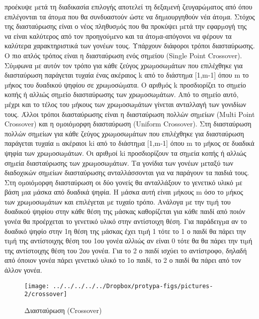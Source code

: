  προέκυψε µετά τη διαδικασία επιλογής αποτελεί τη δεξαµενή ζευγαρώµατος από όπου επιλέγονται τα άτοµα που θα συνδυαστούν ώστε να δηµιουργηθούν νέα άτοµα. Στόχος της διασταύρωσης είναι ο νέος πληθυσµός που θα προκύψει µετά την εφαρµογή της να είναι καλύτερος από τον προηγούµενο και τα άτοµα-απόγονοι να φέρουν τα καλύτερα χαρακτηριστικά των γονέων τους. Υπάρχουν διάφοροι τρόποι διασταύρωσης. Ο πιο απλός τρόπος είναι η διασταύρωση ενός σηµείου (Single Point Crossover). Σύµφωνα µε αυτόν τον τρόπο για κάθε ζεύγος χρωµοσωµάτων που επιλέχθηκε για διασταύρωση παράγεται τυχαία ένας ακέραιος k από το διάστηµα [1,m-1] όπου m το µήκος του δυαδικού ψηφίου σε χρωµοσώµατα. Ο αριθµός k προσδιορίζει το σηµείο κοπής ή αλλιώς σηµείο διασταύρωσης των χρωµοσωµάτων. Από το σηµείο αυτό, µέχρι και το τέλος του µήκους των χρωµοσωµάτων γίνεται ανταλλαγή των γονιδίων τους. Άλλοι τρόποι διασταύρωσης είναι η διασταύρωση πολλών σηµείων (Multi Point Crossover) και η οµοιόµορφη διασταύρωση (Uniform Crossover). Στη διασταύρωση πολλών σηµείων για κάθε ζεύγος χρωµοσωµάτων που επιλέχθηκε για διασταύρωση παράγεται τυχαία n ακέραιοι ki από το διάστηµα [1,m-1] όπου m το µήκος σε δυαδικά ψηφία των χρωµοσωµάτων. Οι αριθµοί ki προσδιορίζουν τα σηµεία κοπής ή αλλιώς σηµεία διασταύρωσης των χρωµοσωµάτων. Τα γονίδια των γονέων µεταξύ των διαδοχικών σηµείων διασταύρωσης ανταλλάσσονται για να παράγουν τα παιδιά τους. Στη οµοιόµορφη διασταύρωση οι δύο γονείς θα ανταλλάξουν το γενετικό υλικό
 µε βάση µια µάσκα από δυαδικά ψηφία. Η µάσκα αυτή είναι µήκους m όσο το µήκος των χρωµοσωµάτων και επιλέγεται µε τυχαίο τρόπο. Ανάλογα µε την τιµή του δυαδικού ψηφίου στην κάθε θέση της µάσκας καθορίζεται για κάθε παιδί από ποιόν γονέα θα προέρχεται το γενετικό υλικό στην αντίστοιχη θέση. Για παράδειγµα αν το δυαδικό ψηφίο στην 1η θέση της µάσκας έχει τιµή 1 τότε το 1 ο παιδί θα πάρει την τιµή της αντίστοιχης θέση του 1ου γονέα αλλιώς αν είναι 0 τότε θα θα πάρει την τιµή της αντίστοιχης θέση του 2ου γονέα. Για το 2 ο παιδί ισχύει το αντίστροφο, δηλαδή από όποιον γονέα πάρει γενετικό υλικό το 1ο παιδί, το 2 ο παιδί θα πάρει από τον
 άλλον γονέα.

 \begin{figure}
 \centering
 \texttt{[image: ../../../../../Dropbox/protypa-figs/pictures-2/crossover]}
 \caption{Διασταύρωση (Crossover) }
 \label{fig:Crossover}
 \end{figure}
 
